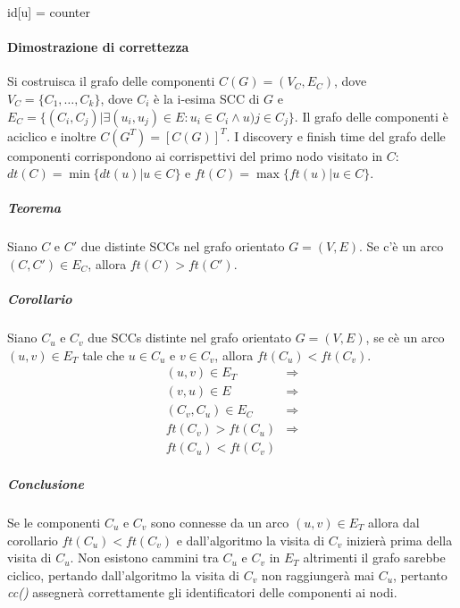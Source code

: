 \begin{multicols}{2}
\begin{algorithm}[H]
\caption{\protect{}}

id[u] = counter\;
\end{algorithm}
\end{multicols}
\paragraph{Dimostrazione di correttezza}
Si costruisca il grafo delle componenti $C(G)=(V_C, E_C)$, dove $V_C=\{C_1, \dots, C_k\}$, dove $C_i$ \`e la i-esima SCC di $G$ e $E_C=\{(C_i, C_j)|\exists 
(u_i, u_j)\in E: u_i\in C_i\land u)j\in C_j\}$. Il grafo delle componenti \`e aciclico e inoltre $C(G^T)=[C(G)]^T$. I discovery e finish time del grafo 
delle componenti corrispondono ai corrispettivi del primo nodo visitato in $C$: $dt(C)=\min\{dt(u)|u\in C\}$ e $ft(C)=\max\{ft(u)|u\in C\}$.
\subparagraph{Teorema}
Siano $C$ e $C'$ due distinte SCCs nel grafo orientato $G=(V, E)$. Se c'\`e un arco $(C, C')\in E_C$, allora $ft(C)>ft(C')$.
\subparagraph{Corollario}
Siano $C_u$ e $C_v$ due SCCs distinte nel grafo orientato $G=(V, E)$, se c\`e un arco $(u, v)\in E_T$ tale che $u\in C_u$ e $v\in C_v$, allora $ft(C_u)<
ft(C_v)$. 
\begin{align*}
(u, v)\in E_T & \Rightarrow\\
(v, u)\in E & \Rightarrow\\
(C_v, C_u)\in E_C & \Rightarrow\\
ft(C_v)>ft(C_u) & \Rightarrow\\
ft(C_u)<ft(C_v) &
\end{align*}
\subparagraph{Conclusione}
Se le componenti $C_u$ e $C_v$ sono connesse da un arco $(u, v)\in E_T$ allora dal corollario $ft(C_u)<ft(C_v)$ e dall'algoritmo la visita di $C_v$ 
inizier\`a prima della visita di $C_u$. Non esistono cammini tra $C_u$ e $C_v$ in $E_T$ altrimenti il grafo sarebbe ciclico, pertando dall'algoritmo la
visita di $C_v$ non raggiunger\`a mai $C_u$, pertanto \emph{cc()} assegner\`a correttamente gli identificatori delle componenti ai nodi.
